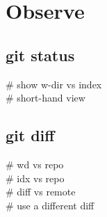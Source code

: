 \section{Observe}

\subsection*{git status}
 \# show w-dir vs index \\
 \# short-hand view \\


\subsection*{git diff}
 \# wd vs repo \\
 \# idx vs repo \\
 \# diff vs remote \\
 \# use a different diff \\


